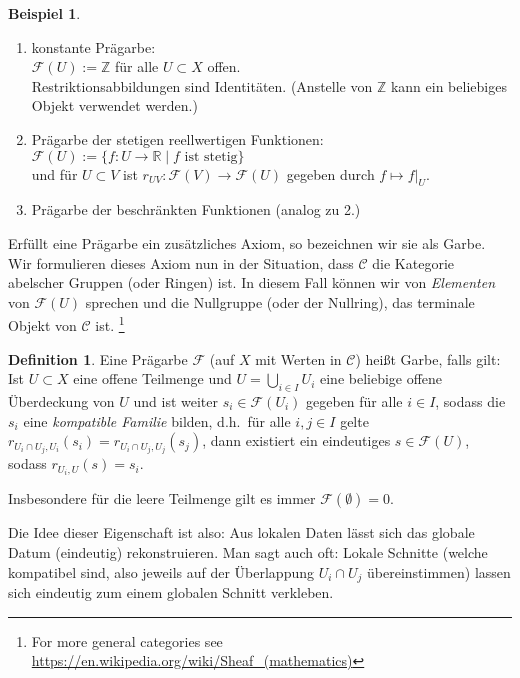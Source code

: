 \documentclass[reqno,12pt]{article}
\numberwithin{equation}{section}
\newcommand{\cC}{\mathcal{C}}
\theoremstyle{plain}
\theoremstyle{definition}
\newtheorem{definition}[thm]{Definition}
\newtheorem{example}[thm]{Beispiel}
\begin{document}
\begin{example}\label{beispiel-presheaf}\text{}\vspace*{-0.8cm}\\
\begin{enumerate}
	\item konstante Prägarbe:\\ $\mathcal{F}(U):=\mathbb{Z}$ für alle $U\subset X$ offen.\\ Restriktionsabbildungen sind Identitäten. (Anstelle von $\mathbb{Z}$ kann ein beliebiges Objekt verwendet werden.)
	\item Prägarbe der stetigen reellwertigen Funktionen:\\ $\mathcal{F}(U):=\{ f\colon U\to \mathbb{R} \mid f \text{ ist stetig} \}$\\
	und für $U\subset V$ ist $r_{UV}\colon \mathcal{F}(V)\to \mathcal{F}(U)$ gegeben durch $f\mapsto f|_U$.
	\item Prägarbe der beschränkten Funktionen (analog zu 2.)
\end{enumerate}
\end{example}
Erfüllt eine Prägarbe ein zusätzliches Axiom, so bezeichnen wir sie als Garbe. Wir formulieren dieses Axiom nun in der Situation, dass $\cC$ die Kategorie abelscher Gruppen (oder Ringen) ist. In diesem Fall können wir von \emph{Elementen} von $\mathcal{F}(U)$ sprechen und die Nullgruppe (oder der Nullring), das terminale Objekt von $\cC$ ist.
\footnote{For more general categories see \url{https://en.wikipedia.org/wiki/Sheaf_(mathematics)}}

\begin{definition}\label{def-sheaf}
Eine Prägarbe $\mathcal{F}$ (auf $X$ mit Werten in $\cC$) heißt {\sf Garbe}, falls gilt:\\
Ist $U\subset X$ eine offene Teilmenge und $U=\bigcup_{i\in I}U_i$ eine beliebige offene Überdeckung von $U$ und ist weiter $s_i\in \mathcal{F}(U_i)$ gegeben für alle $i\in I$, sodass die $s_i$ eine \emph{kompatible Familie} bilden, d.h.\ für alle $i,j\in I$ gelte $r_{U_i\cap U_j,U_i}(s_i)=r_{U_i\cap U_j,U_j}(s_j)$,
dann existiert ein eindeutiges $s\in \mathcal{F}(U)$, sodass $r_{U_i,U}(s)=s_i$.

\smallskip

Insbesondere für die leere Teilmenge gilt es immer $\mathcal{F}(\emptyset) = 0$.
\end{definition}
Die Idee dieser Eigenschaft ist also: \glqq Aus lokalen Daten lässt sich das globale Datum (eindeutig) rekonstruieren\grqq. Man sagt auch oft: Lokale Schnitte (welche kompatibel sind, also jeweils auf der Überlappung $U_i\cap U_j$ übereinstimmen) lassen sich eindeutig zum einem globalen Schnitt \glqq verkleben\grqq.
\end{document}
